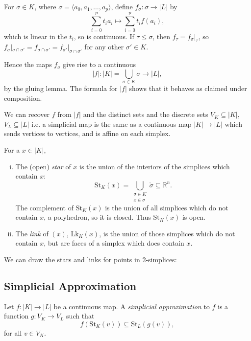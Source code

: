 \documentclass[12pt]{article}
\begin{document}
\begin{proofbox}
	For $\sigma \in K$, where $\sigma = \langle a_0, a_1, \ldots, a_p\rangle$, define $f_\sigma : \sigma \to |L|$ by
	\[
	\sum_{i=  0}^p t_i a_i \mapsto \sum_{i = 0}^p t_i f(a_i),
	\]
	which is linear in the $t_i$, so is continuous. If $\tau \leq \sigma$, then $f_\tau = f_\sigma|_\tau$, so $f_\sigma|_{\sigma \cap \sigma'} = f_{\sigma \cap \sigma'} = f_{\sigma'}|_{\sigma \cap \sigma'}$ for any other $\sigma' \in K$.

	Hence the maps $f_\sigma$ give rise to a continuous 
	\[
	|f| : |K| = \bigcup_{\sigma \in K} \sigma \to |L|,
	\]
	by the gluing lemma. The formula for $|f|$ shows that it behaves as claimed under composition.
\end{proofbox}

We can recover $f$ from $|f|$ and the distinct sets and the discrete sets $V_K \subseteq |K|$, $V_L \subseteq |L|$ i.e. a simplicial map is the same as a continuous map $|K| \to |L|$ which sends vertices to vertices, and is affine on each simplex.

\begin{definition}
	For a $x \in |K|$,
	\begin{enumerate}[(i)]
		\item The (open) \emph{star} of $x$ is the union of the interiors of the simplices which contain $x$:
			\[
			\mathrm{St}_K(x) = \bigcup_{\substack{\sigma \in K\\ x \in \sigma}} \mathring \sigma \subseteq \mathbb{R}^n.
			\]
			The complement of $\mathrm{St}_K(x)$ is the union of all simplices which do not contain $x$, a polyhedron, so it is closed. Thus $\mathrm{St}_K(x)$ is open.
		\item The \emph{link} of $(x)$, $\mathrm{Lk}_K(x)$, is the union of those simplices which do not contain $x$, but are faces of a simplex which does contain $x$.
	\end{enumerate}
\end{definition}

We can draw the stars and links for points in 2-simplices:

\subsection{Simplicial Approximation}
\label{sub:simp_app}

\begin{definition}
	Let $f : |K| \to |L|$ be a continuous map. A \emph{simplicial approximation} to $f$ is a function $g : V_K \to V_L$ such that
	\[
	f(\mathrm{St}_K(v)) \subseteq \mathrm{St}_L(g(v)),
	\]
	for all $v \in V_K$.
\end{definition}
\end{document}
